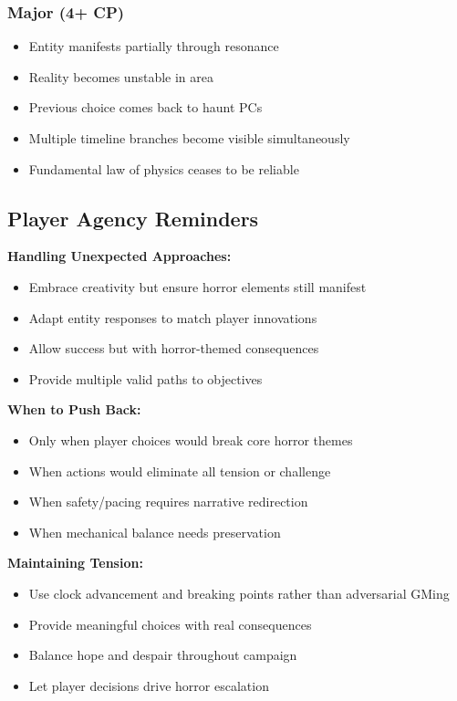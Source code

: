 \documentclass[11pt]{article}
\begin{document}
\subsubsection{Major (4+ CP)}
\begin{itemize}
\item Entity manifests partially through resonance
\item Reality becomes unstable in area
\item Previous choice comes back to haunt PCs
\item Multiple timeline branches become visible simultaneously
\item Fundamental law of physics ceases to be reliable
\end{itemize}

\subsection{Player Agency Reminders}

\textbf{Handling Unexpected Approaches:}
\begin{itemize}
\item Embrace creativity but ensure horror elements still manifest
\item Adapt entity responses to match player innovations
\item Allow success but with horror-themed consequences
\item Provide multiple valid paths to objectives
\end{itemize}

\textbf{When to Push Back:}
\begin{itemize}
\item Only when player choices would break core horror themes
\item When actions would eliminate all tension or challenge
\item When safety/pacing requires narrative redirection
\item When mechanical balance needs preservation
\end{itemize}

\textbf{Maintaining Tension:}
\begin{itemize}
\item Use clock advancement and breaking points rather than adversarial GMing
\item Provide meaningful choices with real consequences
\item Balance hope and despair throughout campaign
\item Let player decisions drive horror escalation
\end{itemize}
\end{document}
